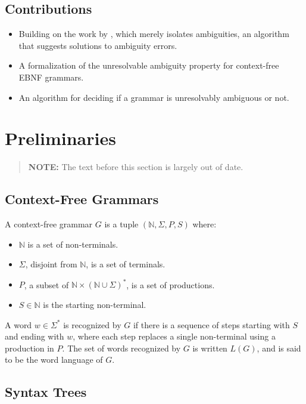 \documentclass[acmsmall,review,anonymous]{acmart}\settopmatter{printfolios=true,printccs=false,printacmref=false}
\newcommand{\NT}{\mathbb{N}} %
\newcommand{\T}{\Sigma} %
\begin{document}
\subsection{Contributions}

\begin{itemize}
  \item Building on the work by \citet{palmkvistCreatingDomainSpecificLanguages2019}, which merely isolates ambiguities, an algorithm that suggests solutions to ambiguity errors.
  \item A formalization of the unresolvable ambiguity property for context-free EBNF grammars.
  \item An algorithm for deciding if a grammar is unresolvably ambiguous or not.
\end{itemize}

\section{Preliminaries}

\begin{quote} %
  \textbf{NOTE:} The text before this section is largely out of date.
\end{quote}

\subsection{Context-Free Grammars}

A context-free grammar $G$ is a tuple $(\NT, \T, P, S)$ where:

\begin{itemize}
\item $\NT$ is a set of non-terminals.
\item $\T$, disjoint from $\NT$, is a set of terminals.
\item $P$, a subset of $\NT \times (\NT \cup \T)^{*}$, is a set of productions.
\item $S \in \NT$ is the starting non-terminal.
\end{itemize}

\noindent A word $w \in \T^{*}$ is recognized by $G$ if there is a sequence of steps starting with $S$ and ending with $w$, where each step replaces a single non-terminal using a production in $P$. The set of words recognized by $G$ is written $L(G)$, and is said to be the word language of $G$.

\subsection{Syntax Trees}
\end{document}

